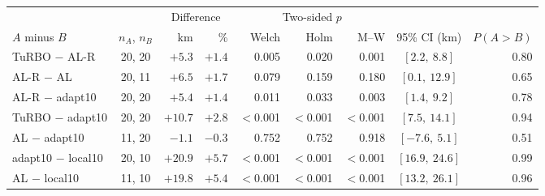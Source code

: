 \begin{tabular*}{\linewidth}{@{\extracolsep{\fill}}lcrrrrrcr@{}}
\toprule
 & & \multicolumn{2}{c}{Difference} & \multicolumn{3}{c}{Two-sided $p$} & & \\
\cmidrule(lr){3-4}\cmidrule(lr){5-7}
$A$ minus $B$ & $n_A$, $n_B$ & km & \% & Welch & Holm & M--W & 95\% CI (km) & $P(A{>}B)$ \\
\midrule
TuRBO $-$ AL-R & 20, 20 & $+5.3$ & $+1.4$ & 0.005 & 0.020 & 0.001 & $[2.2,\ 8.8]$ & 0.80 \\
AL-R $-$ AL & 20, 11 & $+6.5$ & $+1.7$ & 0.079 & 0.159 & 0.180 & $[0.1,\ 12.9]$ & 0.65 \\
AL-R $-$ adapt10 & 20, 20 & $+5.4$ & $+1.4$ & 0.011 & 0.033 & 0.003 & $[1.4,\ 9.2]$ & 0.78 \\
TuRBO $-$ adapt10 & 20, 20 & $+10.7$ & $+2.8$ & $<$0.001 & $<$0.001 & $<$0.001 & $[7.5,\ 14.1]$ & 0.94 \\
AL $-$ adapt10 & 11, 20 & ${-}1.1$ & ${-}0.3$ & 0.752 & 0.752 & 0.918 & $[-7.6,\ 5.1]$ & 0.51 \\
adapt10 $-$ local10 & 20, 10 & $+20.9$ & $+5.7$ & $<$0.001 & $<$0.001 & $<$0.001 & $[16.9,\ 24.6]$ & 0.99 \\
AL $-$ local10 & 11, 10 & $+19.8$ & $+5.4$ & $<$0.001 & $<$0.001 & $<$0.001 & $[13.2,\ 26.1]$ & 0.96 \\
\bottomrule
\end{tabular*}
